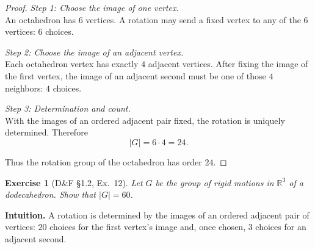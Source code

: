 \documentclass[12pt]{article}
\newtheorem{exercise}[theorem]{Exercise}
\theoremstyle{definition}
\begin{document}
\begin{proof}
\noindent\emph{Step 1: Choose the image of one vertex.}\\

\noindent
An octahedron has $6$ vertices. A rotation may send a fixed vertex to any of the $6$ vertices: $6$ choices.

\dotfill

\noindent\emph{Step 2: Choose the image of an adjacent vertex.}\\

\noindent
Each octahedron vertex has exactly $4$ adjacent vertices. After fixing the image of the first vertex, the image
of an adjacent second must be one of those $4$ neighbors: $4$ choices.

\dotfill

\noindent\emph{Step 3: Determination and count.}\\

\noindent
With the images of an ordered adjacent pair fixed, the rotation is uniquely determined. Therefore
\[
\lvert G\rvert=6\cdot 4=24.
\]

\dotfill

Thus the rotation group of the octahedron has order $24$.
\end{proof}

\newpage

\begin{exercise}[D\&F §1.2, Ex.~12]
Let $G$ be the group of rigid motions in $\mathbb{R}^3$ of a dodecahedron. Show that $\lvert G\rvert=60$.
\end{exercise}

\dotfill

\noindent
\textbf{Intuition.}
A rotation is determined by the images of an ordered adjacent pair of vertices:
$20$ choices for the first vertex’s image and, once chosen, $3$ choices for an adjacent second.

\dotfill
\end{document}
